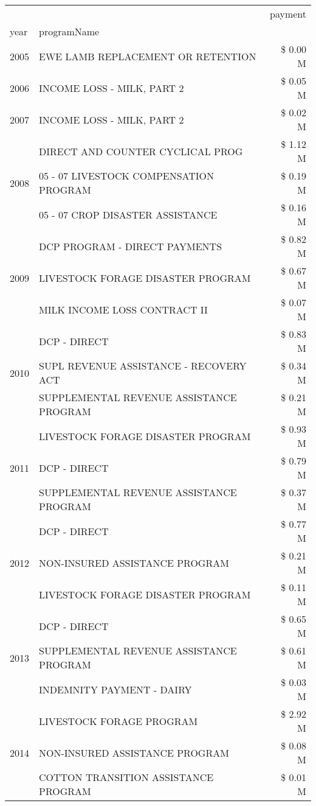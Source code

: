 \begin{tabular}{llr}
\toprule
 &  & payment \\
year & programName &  \\
\midrule
2005 & EWE LAMB REPLACEMENT OR RETENTION & \$ 0.00 M \\
\cline{1-3}
2006 & INCOME LOSS - MILK, PART 2 & \$ 0.05 M \\
\cline{1-3}
2007 & INCOME LOSS - MILK, PART 2 & \$ 0.02 M \\
\cline{1-3}
\multirow[t]{3}{*}{2008} & DIRECT AND COUNTER CYCLICAL PROG & \$ 1.12 M \\
 & 05 - 07 LIVESTOCK COMPENSATION PROGRAM & \$ 0.19 M \\
 & 05 - 07 CROP DISASTER ASSISTANCE & \$ 0.16 M \\
\cline{1-3}
\multirow[t]{3}{*}{2009} & DCP PROGRAM - DIRECT PAYMENTS & \$ 0.82 M \\
 & LIVESTOCK FORAGE DISASTER  PROGRAM & \$ 0.67 M \\
 & MILK INCOME LOSS CONTRACT II & \$ 0.07 M \\
\cline{1-3}
\multirow[t]{3}{*}{2010} & DCP - DIRECT & \$ 0.83 M \\
 & SUPL REVENUE ASSISTANCE - RECOVERY ACT & \$ 0.34 M \\
 & SUPPLEMENTAL REVENUE ASSISTANCE PROGRAM & \$ 0.21 M \\
\cline{1-3}
\multirow[t]{3}{*}{2011} & LIVESTOCK FORAGE DISASTER PROGRAM & \$ 0.93 M \\
 & DCP - DIRECT & \$ 0.79 M \\
 & SUPPLEMENTAL REVENUE ASSISTANCE PROGRAM & \$ 0.37 M \\
\cline{1-3}
\multirow[t]{3}{*}{2012} & DCP - DIRECT & \$ 0.77 M \\
 & NON-INSURED ASSISTANCE PROGRAM & \$ 0.21 M \\
 & LIVESTOCK FORAGE DISASTER PROGRAM & \$ 0.11 M \\
\cline{1-3}
\multirow[t]{3}{*}{2013} & DCP - DIRECT & \$ 0.65 M \\
 & SUPPLEMENTAL REVENUE ASSISTANCE PROGRAM & \$ 0.61 M \\
 & INDEMNITY PAYMENT - DAIRY & \$ 0.03 M \\
\cline{1-3}
\multirow[t]{3}{*}{2014} & LIVESTOCK FORAGE PROGRAM & \$ 2.92 M \\
 & NON-INSURED ASSISTANCE PROGRAM & \$ 0.08 M \\
 & COTTON TRANSITION ASSISTANCE PROGRAM & \$ 0.01 M \\
\cline{1-3}

\end{tabular}
